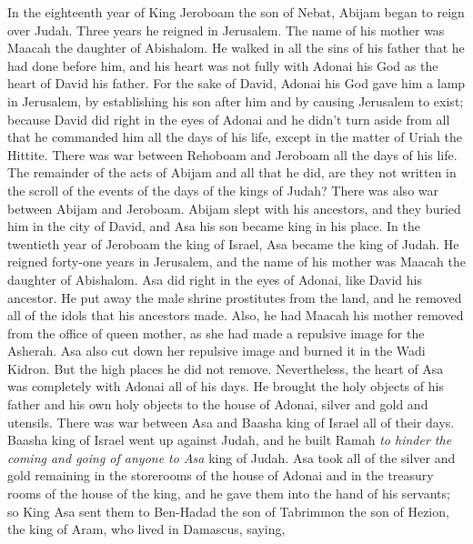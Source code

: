 \begin{biblechapter} %
 In the eighteenth year of King Jeroboam the son of Nebat, Abijam began to reign over Judah.
\verse Three years he reigned in Jerusalem. The name of his mother was Maacah the daughter of Abishalom.
\verse He walked in all the sins of his father that he had done before him, and his heart was not fully with Adonai his God as the heart of David his father.
\verse For the sake of David, Adonai his God gave him a lamp in Jerusalem, by establishing his son after him and by causing Jerusalem to exist;
\verse because David did right in the eyes of Adonai and he didn’t turn aside from all that he commanded him all the days of his life, except in the matter of Uriah the Hittite.
\verse There was war between Rehoboam and Jeroboam all the days of his life.
\verse The remainder of the acts of Abijam and all that he did, are they not written in the scroll of the events of the days of the kings of Judah? There was also war between Abijam and Jeroboam.
\verse Abijam slept with his ancestors, and they buried him in the city of David, and Asa his son became king in his place.
 In the twentieth year of Jeroboam the king of Israel, Asa became the king of Judah.
\verse He reigned forty-one years in Jerusalem, and the name of his mother was Maacah the daughter of Abishalom.
\verse Asa did right in the eyes of Adonai, like David his ancestor.
\verse He put away the male shrine prostitutes from the land, and he removed all of the idols that his ancestors made.
\verse Also, he had Maacah his mother removed from the office of queen mother, as she had made a repulsive image for the Asherah. Asa also cut down her repulsive image and burned it in the Wadi Kidron.
\verse But the high places he did not remove. Nevertheless, the heart of Asa was completely with Adonai all of his days.
\verse He brought the holy objects of his father and his own holy objects to the house of Adonai, silver and gold and utensils.
\verse There was war between Asa and Baasha king of Israel all of their days.
\verse Baasha king of Israel went up against Judah, and he built Ramah \textit{to hinder the coming and going of anyone to Asa} king of Judah.
\verse Asa took all of the silver and gold remaining in the storerooms of the house of Adonai and in the treasury rooms of the house of the king, and he gave them into the hand of his servants; so King Asa sent them to Ben-Hadad the son of Tabrimmon the son of Hezion, the king of Aram, who lived in Damascus, saying,

\end{biblechapter}

